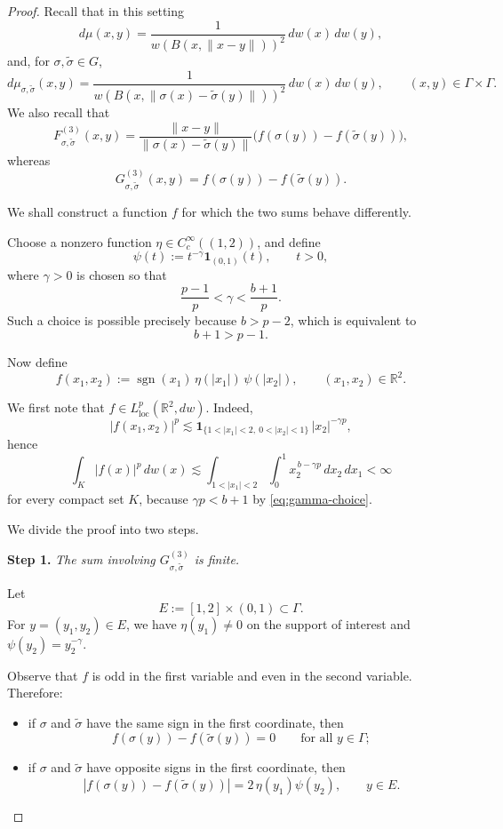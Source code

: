 \documentclass[12pt]{amsart}
\begin{document}
\begin{proof}
Recall that in this setting
\[
d\mu(x,y)=\frac{1}{w(B(x,\|x-y\|))^2}\,dw(x)\,dw(y),
\]
and, for \(\sigma,\tilde{\sigma}\in G\),
\[
d\mu_{\sigma,\tilde{\sigma}}(x,y)
=
\frac{1}{w(B(x,\|\sigma(x)-\tilde{\sigma}(y)\|))^2}\,dw(x)\,dw(y),
\qquad (x,y)\in \Gamma\times\Gamma.
\]
We also recall that
\[
F_{\sigma,\tilde{\sigma}}^{(3)}(x,y)
=
\frac{\|x-y\|}{\|\sigma(x)-\tilde{\sigma}(y)\|}
\bigl(f(\sigma(y))-f(\tilde{\sigma}(y))\bigr),
\]
whereas
\[
G_{\sigma,\tilde{\sigma}}^{(3)}(x,y)
=
f(\sigma(y))-f(\tilde{\sigma}(y)).
\]

We shall construct a function \(f\) for which the two sums behave differently.

Choose a nonzero function \(\eta\in C_c^\infty((1,2))\), and define
\[
\psi(t):=t^{-\gamma}\mathbf 1_{(0,1)}(t),\qquad t>0,
\]
where \(\gamma>0\) is chosen so that
\begin{equation}\label{eq:gamma-choice}
\frac{p-1}{p}<\gamma<\frac{b+1}{p}.
\end{equation}
Such a choice is possible precisely because \(b>p-2\), which is equivalent to
\[
b+1>p-1.
\]

Now define
\[
f(x_1,x_2):=\operatorname{sgn}(x_1)\,\eta(|x_1|)\,\psi(|x_2|),
\qquad (x_1,x_2)\in \mathbb R^2.
\]

We first note that \(f\in L^p_{\mathrm{loc}}(\mathbb R^2,dw)\). Indeed,
\[
|f(x_1,x_2)|^p
\lesssim
\mathbf 1_{\{1<|x_1|<2,\ 0<|x_2|<1\}}\,|x_2|^{-\gamma p},
\]
hence
\[
\int_K |f(x)|^p\,dw(x)
\lesssim
\int_{1<|x_1|<2}\int_0^1 x_2^{\,b-\gamma p}\,dx_2\,dx_1
<\infty
\]
for every compact set \(K\), because \(\gamma p<b+1\) by \eqref{eq:gamma-choice}.

We divide the proof into two steps.

\medskip

\noindent
\textbf{Step 1.}
\emph{The sum involving \(G_{\sigma,\tilde{\sigma}}^{(3)}\) is finite.}

Let
\[
E:=[1,2]\times(0,1)\subset \Gamma.
\]
For \(y=(y_1,y_2)\in E\), we have \(\eta(y_1)\neq 0\) on the support of interest and \(\psi(y_2)=y_2^{-\gamma}\).

Observe that \(f\) is odd in the first variable and even in the second variable. Therefore:

\begin{itemize}
\item if \(\sigma\) and \(\tilde{\sigma}\) have the same sign in the first coordinate, then
\[
f(\sigma(y))-f(\tilde{\sigma}(y))=0
\qquad\text{for all } y\in \Gamma;
\]
\item if \(\sigma\) and \(\tilde{\sigma}\) have opposite signs in the first coordinate, then
\[
|f(\sigma(y))-f(\tilde{\sigma}(y))|
=
2\,\eta(y_1)\psi(y_2),
\qquad y\in E.
\]
\end{itemize}


\end{proof}
\end{document}
